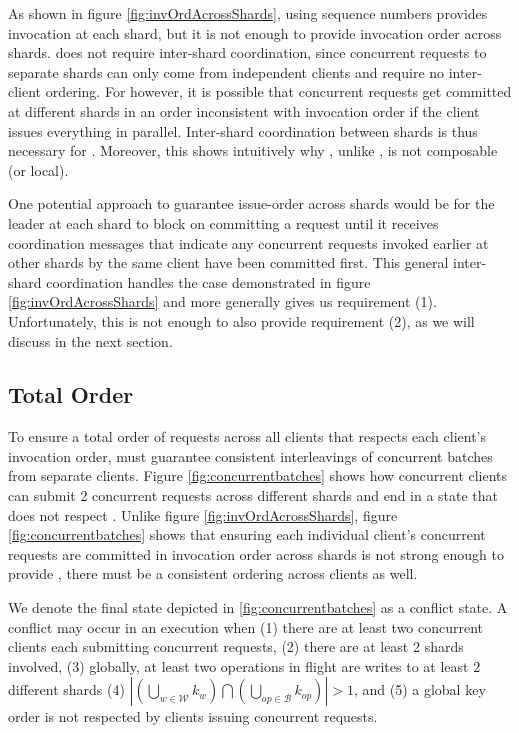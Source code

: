 As shown in figure \ref{fig:invOrdAcrossShards}, using sequence numbers provides invocation at each shard, but it is not enough to provide invocation order across shards. \sdl does not require inter-shard coordination, since concurrent requests to separate shards can only come from independent clients and require no inter-client ordering. For \mdl however, it is possible that concurrent requests get committed at different shards in an order inconsistent with invocation order if the client issues everything in parallel. Inter-shard coordination between shards is thus necessary for \md. Moreover, this shows intuitively why \mdl, unlike \sdl, is not composable (or local).

One potential approach to guarantee issue-order across shards would be for the leader at each shard to block on committing a request until it receives coordination messages that indicate any concurrent requests invoked earlier at other shards by the same client have been committed first. This general inter-shard coordination handles the case demonstrated in figure \ref{fig:invOrdAcrossShards} and more generally gives us requirement (1). Unfortunately, this is not enough to also provide requirement (2), as we will discuss in the next section.

\subsection{Total Order}
To ensure a total order of requests across all clients that respects each client's invocation order, \mdl must guarantee consistent interleavings of concurrent batches from separate clients. Figure \ref{fig:concurrentbatches} shows how concurrent clients can submit 2 concurrent requests across different shards and end in a state that does not respect \mdl. Unlike figure \ref{fig:invOrdAcrossShards}, figure \ref{fig:concurrentbatches} shows that ensuring each individual client's concurrent requests are committed in invocation order across shards is not strong enough to provide \mdl, there must be a consistent ordering across clients as well.

We denote the final state depicted in \ref{fig:concurrentbatches} as a conflict state. A conflict may occur in an execution when (1) there are at least two concurrent clients each submitting concurrent requests, (2) there are at least 2 shards involved, (3) globally, at least two operations in flight are writes to at least 2 different shards (4) $|(\bigcup\limits_{w \in \mathcal{W}}k_w) \bigcap (\bigcup\limits_{op \in \mathcal{B}}k_{op})| > 1$, and (5) a global key order is not respected by clients issuing concurrent requests. 

